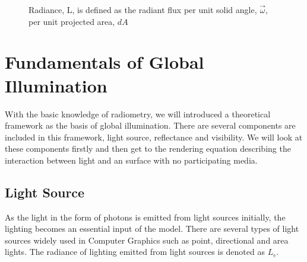 \begin{figure}[htp] 
    \centering 
    \renewcommand{\thefigure}{\thechapter.\arabic{figure}}
    \caption[]{Radiance, L, is defined as the radiant flux per unit solid angle, \(\overrightarrow{\omega}\), per unit projected area, \(dA\)}
    \label{fig:radiance_solid_angle} 
\end{figure} 


\section{Fundamentals of Global Illumination}
With the basic knowledge of radiometry, we will introduced a theoretical framework as the basis of global illumination. There are several components are included in this framework, light source, reflectance and visibility. We will look at these components firstly and then get to the rendering equation describing the interaction between light and an surface with no participating media. 

\subsection{Light Source} 
As the light in the form of photons is emitted from light sources initially, the lighting becomes an essential input of the model. There are several types of light sources widely used in Computer Graphics such as point, directional and area lights. The radiance of lighting emitted from light sources is denoted as \( L_{e} \). 

